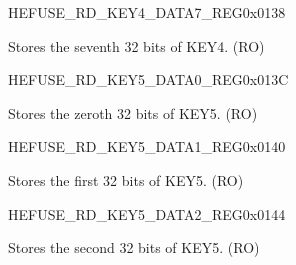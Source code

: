 \begin{register}{H}{EFUSE\_RD\_KEY4\_DATA7\_REG}{0x0138}\label{regdesc:EFUSERDKEY4DATA7REG}
%
\regnewline%
\begin{regdesc}\begin{reglist}
\label{fielddesc:EFUSEKEY4DATA7}\item [EFUSE\_KEY4\_DATA7] Stores the seventh 32 bits of KEY4. (RO)
\end{reglist}\end{regdesc}
\end{register}


\begin{register}{H}{EFUSE\_RD\_KEY5\_DATA0\_REG}{0x013C}\label{regdesc:EFUSERDKEY5DATA0REG}
%
\regnewline%
\begin{regdesc}\begin{reglist}
\label{fielddesc:EFUSEKEY5DATA0}\item [EFUSE\_KEY5\_DATA0] Stores the zeroth 32 bits of KEY5. (RO)
\end{reglist}\end{regdesc}
\end{register}


\begin{register}{H}{EFUSE\_RD\_KEY5\_DATA1\_REG}{0x0140}\label{regdesc:EFUSERDKEY5DATA1REG}
%
\regnewline%
\begin{regdesc}\begin{reglist}
\label{fielddesc:EFUSEKEY5DATA1}\item [EFUSE\_KEY5\_DATA1] Stores the first 32 bits of KEY5. (RO)
\end{reglist}\end{regdesc}
\end{register}


\begin{register}{H}{EFUSE\_RD\_KEY5\_DATA2\_REG}{0x0144}\label{regdesc:EFUSERDKEY5DATA2REG}
%
\regnewline%
\begin{regdesc}\begin{reglist}
\label{fielddesc:EFUSEKEY5DATA2}\item [EFUSE\_KEY5\_DATA2] Stores the second 32 bits of KEY5. (RO)
\end{reglist}\end{regdesc}
\end{register}


